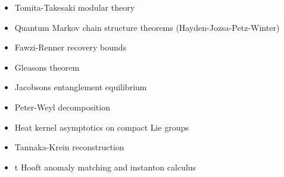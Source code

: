 \begin{itemize}
\tightlist
\item
  Tomita-Takesaki modular theory
\item
  Quantum Markov chain structure theorems (Hayden-Jozsa-Petz-Winter)
\item
  Fawzi-Renner recovery bounds
\item
  Gleason\textquotesingle s theorem
\item
  Jacobson\textquotesingle s entanglement equilibrium
\item
  Peter-Weyl decomposition
\item
  Heat kernel asymptotics on compact Lie groups
\item
  Tannaka-Krein reconstruction
\item
  \textquotesingle t Hooft anomaly matching and instanton calculus
\end{itemize}
